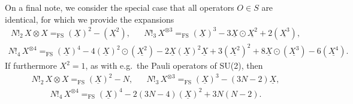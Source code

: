 \documentclass[nofootinbib,notitlepage,11pt]{revtex4-2}
\newcommand{\p}[1]{\left(#1\right)} %
\newcommand{\1}{\mathds{1}}
\newcommand{\EQFS}{=_{\text{FS}}}
\newcommand{\col}{\underline}
\begin{document}
On a final note, we consider the special case that all operators
$O\in S$ are identical, for which we provide the expansions
\begin{align}
  N!_2\, X\otimes X \EQFS \p{\col{X}}^2 - \p{\col{X^2}},
  &&
  N!_3\, X^{\otimes 3} \EQFS \p{\col{X}}^3
  - 3 \col{X} \odot \col{X^2} + 2\p{\col{X^3}},
\end{align}
\begin{align}
  N!_4\, X^{\otimes 4}
  \EQFS \p{\col{X}}^4 - 4 \p{\col{X}}^2\odot\p{\col{X^2}}
  - 2 \col{X} \p{\col{X}}^2 \col{X}
  + 3 \p{\col{X^2}}^2 + 8 \col{X} \odot \p{\col{X^3}}
  - 6 \p{\col{X^4}}.
\end{align}
If furthermore $X^2=1$, as with e.g.~the Pauli operators of SU(2),
then
\begin{align}
  N!_2\, X\otimes X \EQFS \p{\col{X}}^2 - N,
  &&
  N!_3\, X^{\otimes 3} \EQFS \p{\col{X}}^3 - \p{3N-2} \col{X},
\end{align}
\begin{align}
  N!_4\, X^{\otimes 4} \EQFS \p{\col{X}}^4
  - 2\p{3N-4} \p{\col{X}}^2 + 3 N \p{N-2}.
\end{align}


\end{document}
